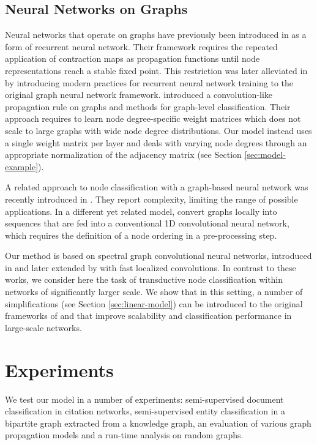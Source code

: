 \documentclass{article} \usepackage{iclr2017_conference,times}
\begin{document}
\subsection{Neural Networks on Graphs} Neural networks that operate on graphs have previously been introduced in \cite{gori2005new, scarselli2009graph} as a form of recurrent neural network. Their framework requires the repeated application of contraction maps as propagation functions until node representations reach a stable fixed point. This restriction was later alleviated in \cite{li2015gated} by introducing modern practices for recurrent neural network training to the original graph neural network framework. \cite{duvenaud2015convolutional} introduced a convolution-like propagation rule on graphs and methods for graph-level classification. Their approach requires to learn node degree-specific weight matrices which does not scale to large graphs with wide node degree distributions. Our model instead uses a single weight matrix per layer and deals with varying node degrees through an appropriate normalization of the adjacency matrix (see Section \ref{sec:model-example}).

A related approach to node classification with a graph-based neural network was recently introduced in \cite{atwood2016diffusion}. They report  complexity, limiting the range of possible applications. In a different yet related model, \cite{niepert2016learning} convert graphs locally into sequences that are fed into a conventional 1D convolutional neural network, which requires the definition of a node ordering in a pre-processing step.

Our method is based on spectral graph convolutional neural networks, introduced in \cite{bruna2014spectral} and later extended by \cite{defferrard2016convolutional} with fast localized convolutions. In contrast to these works, we consider here the task of transductive node classification within networks of significantly larger scale. We show that in this setting, a number of simplifications (see Section \ref{sec:linear-model}) can be introduced to the original frameworks of \cite{bruna2014spectral} and \cite{defferrard2016convolutional} that improve scalability and classification performance in large-scale networks.

\section{Experiments}
We test our model in a number of experiments: semi-supervised document classification in citation networks, semi-supervised entity classification in a bipartite graph extracted from a knowledge graph, an evaluation of various graph propagation models and a run-time analysis on random graphs.
\end{document}
